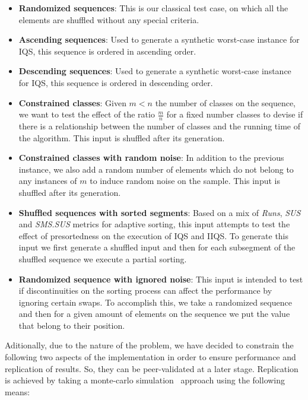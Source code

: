 \begin{itemize}
        
    \item{\textbf{Randomized sequences}: 
    This is our classical test case, on which all the elements are shuffled without any special criteria.}

    \item{\textbf{Ascending sequences}: 
    Used to generate a synthetic worst-case instance for IQS, this sequence is ordered in ascending order.}

    \item{\textbf{Descending sequences}: 
    Used to generate a synthetic worst-case instance for IQS, this sequence is ordered in descending order.}

    \item{\textbf{Constrained classes}: 
    Given $m < n$ the number of classes on the sequence, we want to test the effect of the ratio $\frac{m}{n}$ for a fixed number classes to devise if there is a relationship between the number of classes and the running time of the algorithm. This input is shuffled after its generation.}

    \item{\textbf{Constrained classes with random noise}: 
    In addition to the previous instance, we also add a random number of elements which do not belong to any instances of $m$ to induce random noise on the sample. This input is shuffled after its generation.}

    \item{\textbf{Shuffled sequences with sorted segments}: 
    Based on a mix of \textit{Runs}, \textit{SUS} and \textit{SMS.SUS} metrics for adaptive sorting, this input attempts to test the effect of presortedness on the execution of IQS and IIQS. To generate this input we first generate a shuffled input and then for each subsegment of the shuffled sequence we execute a partial sorting.}

    \item{\textbf{Randomized sequence with ignored noise}: 
    This input is intended to test if discontinuities on the sorting process can affect the performance by ignoring certain swaps. To accomplish this, we take a randomized sequence and then for a given amount of elements on the sequence we put the value that belong to their position.}
\end{itemize}

Aditionally, due to the nature of the problem, we have decided to constrain the following two aspects of the implementation in order to ensure performance and replication of results. So, they can be peer-validated at a later stage. Replication is achieved by taking a monte-carlo simulation~\cite{10.5555/1614191} approach using the following means:

